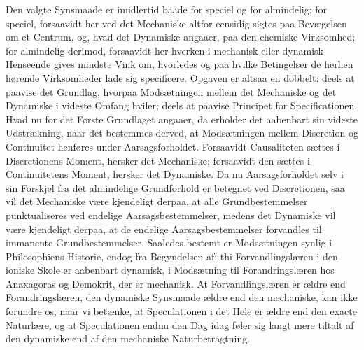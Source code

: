 \documentclass[12pt]{book}
\newcommand{\opage}[1]{\marginnote{\footnotesize\textit{[#1]}}}
\begin{document}
Den valgte Synsmaade er imidlertid baade for speciel og for almindelig; for speciel,
forsaavidt her ved det Mechaniske altfor eensidig sigtes paa Bevægelsen om et Centrum,
og, hvad det Dynamiske angaaer, paa den chemiske Virksomhed; for almindelig derimod,
forsaavidt her hverken i mechanisk eller dynamisk Henseende gives mindste Vink om,
hvorledes og paa hvilke Betingelser de herhen hørende Virksomheder lade sig
specificere. Opgaven er altsaa en dobbelt: deels at paavise det Grundlag, hvorpaa
Modsætningen mellem det Mechaniske og det Dynamiske i videste Omfang hviler; deels at
paavise Principet for Specificationen. Hvad nu for det Første Grundlaget angaaer, da
erholder det aabenbart sin
\opage{332} videste Udstrækning, naar det bestemmes derved, at Modsætningen mellem Discretion og
Continuitet henføres under Aarsagsforholdet. Forsaavidt Causaliteten sættes i
Discretionens Moment, hersker det Mechaniske; forsaavidt den sættes i Continuitetens
Moment, hersker det Dynamiske. Da nu Aarsagsforholdet selv i sin Forskjel fra det
almindelige Grundforhold er betegnet ved Discretionen, saa vil det Mechaniske være
kjendeligt derpaa, at alle Grundbestemmelser punktualiseres ved endelige
Aarsagsbestemmelser, medens det Dynamiske vil være kjendeligt derpaa, at de endelige
Aarsagsbestemmelser forvandles til immanente Grundbestemmelser. Saaledes bestemt er
Modsætningen synlig i Philosophiens Historie, endog fra Begyndelsen af; thi
Forvandlingslæren i den ioniske Skole er aabenbart dynamisk, i Modsætning til
Forandringslæren hos Anaxagoras og Demokrit, der er mechanisk. At Forvandlingslæren er
ældre end Forandringslæren, den dynamiske Synsmaade ældre end den mechaniske, kan ikke
forundre os, naar vi betænke, at Speculationen i det Hele er ældre end den exacte
Naturlære, og at Speculationen endnu den Dag idag føler sig langt mere tiltalt af den
dynamiske end af den mechaniske Naturbetragtning.
\end{document}
